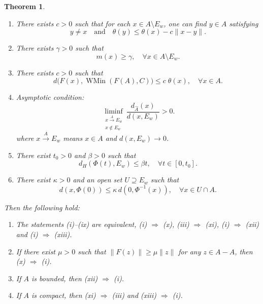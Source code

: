 \documentclass[10pt,a4paper]{amsart}
\newtheorem{theorem}{Theorem}[section]
\begin{document}
\begin{theorem}
\begin{enumerate}
			
			
			\item[(viii)] There exists   \(c>0\) such that for each \(x\in A\setminus E_w\), one can find \(y\in A\) satisfying
			\begin{equation}\label{EevL}
				y\neq x \quad\text{and}\quad
				\theta(y)\le \theta(x)-c\|x-y\| .
	 \end{equation}
			
					\item[(ix)]   There exists   \(\gamma >0\) such that
				\[
				m(x)\ge \gamma,\quad\forall x\in A\setminus E_w.
				\]
			
			 	\item[(x)]  There exists $c>0$ such that    
 	$$ d \bigl(F(x),\operatorname{WMin}(F(A),C)\bigr)     \le c \; \theta(x),   \quad  \forall x\in A.$$ 
		
		\item[(xi)]  Asymptotic   condition:
		\[
		\liminf_{\substack{x\xrightarrow{A} E_w\\ x\notin E_w}}\frac{d_{\widehat{A}}(x)}{d(x,E_w)}>0.
		\]
		where $x\xrightarrow{A} E_w$ means $x\in A$ and $d(x,E_w)\to 0$.
		
		\item[(xii)] There exist \(t_0 > 0\) and \(\beta > 0\) such that 
		\[
		d_H(\Phi(t), E_w) \le \beta t,  \quad  \forall t \in [0, t_0].
		\]
 
		
	\item[(xiii)] There exist $\kappa>0$ and an open set $U\supseteq E_w$ such that \begin{equation}\label{EBkmJ} 
			d(x,\Phi(0))\le\kappa\,d(0,\Phi^{-1}(x)),       \quad  \forall       x\in U\cap A. 	
			\end{equation}	 
	\end{enumerate}
	 	Then the following hold:
		\begin{enumerate}
		\item The statements (i)--(ix) are equivalent, (i) $\Rightarrow$ (x), (iii) $\Rightarrow$ (xi),  (i) $\Rightarrow$ (xii) and (i) $\Rightarrow$ (xiii). 
			\item  If there exist $\mu>0$ such that $\|F(z)\|\ge\mu\|z\|$ for any $z\in A-A$,
	then (x) $\Rightarrow$ (i).
			\item  If $A$ is bounded, then (xii) $\Rightarrow$ (i).
	 \item  	If $A$ is compact, then (xi) $\Rightarrow$ (iii) and (xiii) $\Rightarrow$ (i).  
	\end{enumerate}
\end{theorem}
\end{document}
